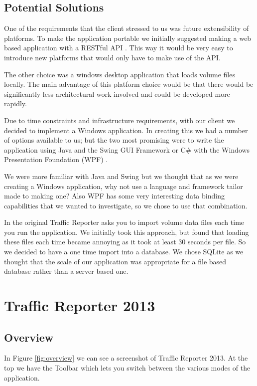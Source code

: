 \documentclass{article}
\begin{document}
\subsection{Potential Solutions}
One of the requirements that the client stressed to us was
future extensibility of platforms. To make the application
portable we initially suggested making a web based
application with a RESTful API \cite{fielding2002principled}. This way it would be
very easy to introduce new platforms that would only have to
make use of the API.

The other choice was a windows desktop application that
loads volume files locally. The main advantage of this
platform choice would be that there would be significantly less
architectural work involved and could be developed more
rapidly.

Due to time constraints and infrastructure requirements, with our client we decided to implement a Windows application.
In creating this we had a number of options available to us; but the two most promising were to write the application using Java and the Swing GUI Framework \cite{swing} or C\# with the Windows Presentation Foundation (WPF) \cite{wpf}.

We were more familiar with Java and Swing but we thought that as we were creating a Windows application, why not use a language and framework tailor made to making one? Also WPF has some very interesting data binding capabilities that we wanted to investigate, so we chose to use that combination.

In the original Traffic Reporter asks you to import volume data files each time you run the application. We initially took this approach, but found that loading these files each time became annoying as it took at least 30 seconds per file. So we decided to have a one time import into a database. We chose SQLite \cite{sqlite} as we thought that the scale of our application was appropriate for a file based database rather than a server based one.

\section{Traffic Reporter 2013}

\subsection{Overview}

In Figure \ref{fig:overview} we can see a screenshot of Traffic Reporter 2013. At the top we have the Toolbar which lets you switch between the various modes of the application. 
\end{document}
